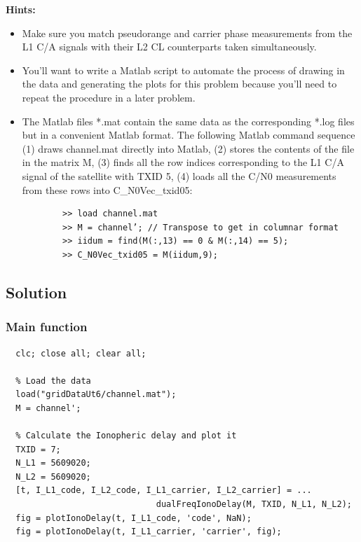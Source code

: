 \textbf{Hints:}\\


\begin{itemize}
	\item Make sure you match pseudorange and carrier phase measurements from the
	      L1 C/A signals with their L2 CL counterparts taken simultaneously.
	\item You’ll want to write a Matlab script to automate the process of drawing
	      in the data and generating the plots for this problem because you’ll
	      need to repeat the procedure in a later problem.
	\item The Matlab files *.mat contain the same data as the corresponding *.log
	      files but in a convenient Matlab format. The following Matlab command
	      sequence (1) draws channel.mat directly into Matlab, (2) stores the
	      contents of the file in the matrix M, (3) finds all the row indices
	      corresponding to the L1 C/A signal of the satellite with TXID 5,
	      (4) loads all the C/N0 measurements from these rows into C\_N0Vec\_txid05:

	      \begin{verbatim}
        >> load channel.mat
        >> M = channel’; // Transpose to get in columnar format
        >> iidum = find(M(:,13) == 0 & M(:,14) == 5);
        >> C_N0Vec_txid05 = M(iidum,9);
        \end{verbatim}
\end{itemize}


\subsection{Solution}

\subsubsection{Main function}

\begin{lstlisting}
  clc; close all; clear all;

  % Load the data
  load("gridDataUt6/channel.mat");
  M = channel';

  % Calculate the Ionopheric delay and plot it
  TXID = 7;
  N_L1 = 5609020;
  N_L2 = 5609020;
  [t, I_L1_code, I_L2_code, I_L1_carrier, I_L2_carrier] = ...
                              dualFreqIonoDelay(M, TXID, N_L1, N_L2);
  fig = plotIonoDelay(t, I_L1_code, 'code', NaN);
  fig = plotIonoDelay(t, I_L1_carrier, 'carrier', fig);
\end{lstlisting}

